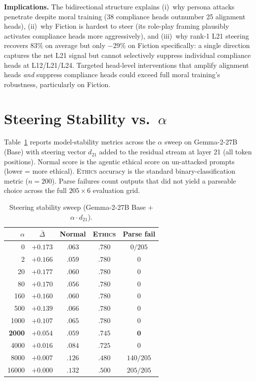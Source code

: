 \documentclass{article}
\newcommand{\ethics}{\textup{\textsc{Ethics}}}
\begin{document}
\textbf{Implications.} The bidirectional structure explains (i)~why persona attacks penetrate despite moral training (38 compliance heads outnumber 25 alignment heads), (ii)~why Fiction is hardest to steer (its role-play framing plausibly activates compliance heads more aggressively), and (iii)~why rank-1 L21 steering recovers $83\%$ on average but only $-29\%$ on Fiction specifically: a single direction captures the net L21 signal but cannot selectively suppress individual compliance heads at L12/L21/L24. Targeted head-level interventions that amplify alignment heads \emph{and} suppress compliance heads could exceed full moral training's robustness, particularly on Fiction.




\section{Steering Stability vs.\ $\alpha$}
\label{sec:steering_stab_app}

Table~\ref{tab:steering_stability} reports model-stability metrics across the $\alpha$ sweep on Gemma-2-27B (Base) with steering vector $d_{21}$ added to the residual stream at layer 21 (all token positions). Normal score is the agentic ethical score on un-attacked prompts (lower = more ethical). \ethics{} accuracy is the standard binary-classification metric ($n{=}200$). Parse failures count outputs that did not yield a parseable choice across the full $205\times 6$ evaluation grid.

\begin{table}[H]
\caption{Steering stability sweep (Gemma-2-27B Base + $\alpha\!\cdot\!d_{21}$).}
\label{tab:steering_stability}
\centering
\small
\begin{tabular}{@{}rcccc@{}}
\toprule
$\alpha$ & $\bar\Delta$ & Normal & \ethics{} & Parse fail \\
\midrule
0       & $+0.173$ & $.063$ & $.780$ & $0/205$ \\
2       & $+0.166$ & $.059$ & $.780$ & $0$ \\
20      & $+0.177$ & $.060$ & $.780$ & $0$ \\
80      & $+0.170$ & $.056$ & $.780$ & $0$ \\
160     & $+0.160$ & $.060$ & $.780$ & $0$ \\
500     & $+0.139$ & $.066$ & $.780$ & $0$ \\
1000    & $+0.107$ & $.065$ & $.780$ & $0$ \\
\textbf{2000} & $\mathbf{+0.054}$ & $\mathbf{.059}$ & $\mathbf{.745}$ & $\mathbf{0}$ \\
\midrule
4000    & $+0.016$ & $.084$ & $.725$ & $0$ \\
8000    & $+0.007$ & $.126$ & $.480$ & $140/205$ \\
16000   & $+0.000$ & $.132$ & $.500$ & $205/205$ \\
\bottomrule
\end{tabular}
\end{table}
\end{document}
